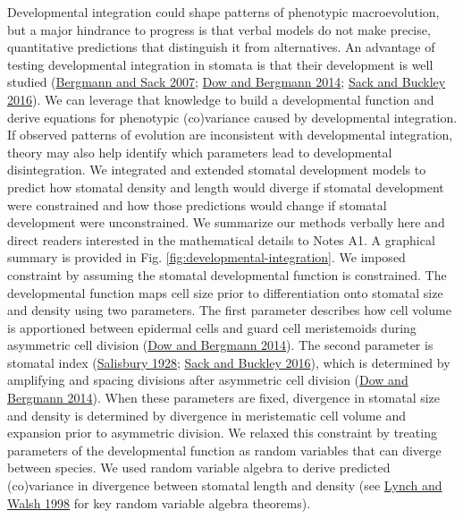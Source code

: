 \documentclass[
  12pt,
]{article}
\begin{document}
Developmental integration could shape patterns of phenotypic macroevolution, but a major hindrance to progress is that verbal models do not make precise, quantitative predictions that distinguish it from alternatives. An advantage of testing developmental integration in stomata is that their development is well studied (\protect\hyperlink{ref-bergmann_stomatal_2007}{Bergmann and Sack 2007}; \protect\hyperlink{ref-dow_patterning_2014}{Dow and Bergmann 2014}; \protect\hyperlink{ref-sack_developmental_2016}{Sack and Buckley 2016}). We can leverage that knowledge to build a developmental function and derive equations for phenotypic (co)variance caused by developmental integration. If observed patterns of evolution are inconsistent with developmental integration, theory may also help identify which parameters lead to developmental disintegration. We integrated and extended stomatal development models to predict how stomatal density and length would diverge if stomatal development were constrained and how those predictions would change if stomatal development were unconstrained. We summarize our methods verbally here and direct readers interested in the mathematical details to Notes A1. A graphical summary is provided in Fig. \ref{fig:developmental-integration}. We imposed constraint by assuming the stomatal developmental function is constrained. The developmental function maps cell size prior to differentiation onto stomatal size and density using two parameters. The first parameter describes how cell volume is apportioned between epidermal cells and guard cell meristemoids during asymmetric cell division (\protect\hyperlink{ref-dow_patterning_2014}{Dow and Bergmann 2014}). The second parameter is stomatal index (\protect\hyperlink{ref-salisbury_i_1928}{Salisbury 1928}; \protect\hyperlink{ref-sack_developmental_2016}{Sack and Buckley 2016}), which is determined by amplifying and spacing divisions after asymmetric cell division (\protect\hyperlink{ref-dow_patterning_2014}{Dow and Bergmann 2014}). When these parameters are fixed, divergence in stomatal size and density is determined by divergence in meristematic cell volume and expansion prior to asymmetric division. We relaxed this constraint by treating parameters of the developmental function as random variables that can diverge between species. We used random variable algebra to derive predicted (co)variance in divergence between stomatal length and density (see \protect\hyperlink{ref-lynch_genetics_1998}{Lynch and Walsh 1998} for key random variable algebra theorems).
\end{document}
